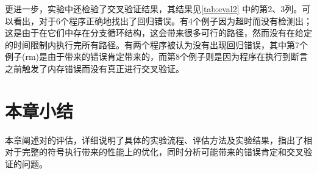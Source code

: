 更进一步，实验中还检验了交叉验证结果，其结果见\autoref{tab:eval2} 中的第2、3列。可以看出，对于6个程序\dryrun 正确地找出了回归错误。有4个例子因为超时而没有检测出；这是由于在它们\bug\scope 中存在分支循环结构，这会带来很多可行的路径，然而\dryrun 没有在给定的时间限制内执行完所有路径。有两个程序被认为没有出现回归错误，其中第7个例子(rm)是由于\bug\scope 带来的错误肯定带来的，而第8个例子则是因为程序在执行到断言之前触发了内存错误而没有真正进行交叉验证。

\section{本章小结}
\label{sec:c5}
本章阐述对\dryrun 的评估，详细说明了具体的实验流程、评估方法及实验结果，指出了相对于完整的符号执行\dryrun 带来的性能上的优化，同时分析可能带来的错误肯定和交叉验证的问题。